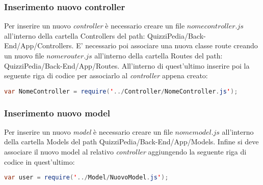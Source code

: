 \subsubsection{Inserimento nuovo controller}
Per inserire un nuovo \textit{controller} è necessario creare un file $nomecontroller.js$ all'interno della cartella Controllers del path: QuizziPedia/Back-End/App/Controllers. E' necessario poi associare una nuova classe route creando un nuovo file $nomerouter.js$ all'interno della cartella Routes del path: QuizziPedia/Back-End/App/Routes. All'interno di quest'ultimo inserire poi la seguente riga di codice per associarlo al \textit{controller} appena creato:
\begin{lstlisting}[language=Java,firstnumber=1]
	var NomeController = require('../Controller/NomeController.js');
\end{lstlisting}

\subsubsection{Inserimento nuovo model}
Per inserire un nuovo \textit{model} è necessario creare un file $nomemodel.js$ all'interno della cartella Models del path QuizziPedia/Back-End/App/Models. Infine si deve associare il nuovo model al relativo \textit{controller} aggiungendo la seguente riga di codice in quest'ultimo:
\begin{lstlisting}[language=Java,firstnumber=1]
	var user = require('../Model/NuovoModel.js');
\end{lstlisting}